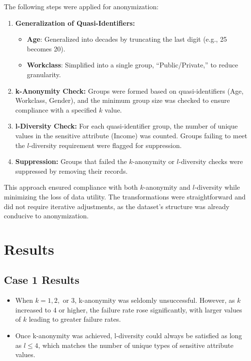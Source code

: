 \documentclass[conference]{IEEEtran}
\begin{document}
The following steps were applied for anonymization: \begin{enumerate} \item \textbf{Generalization of Quasi-Identifiers:} \begin{itemize} \item \textbf{Age}: Generalized into decades by truncating the last digit (e.g., 25 becomes 20). \item \textbf{Workclass}: Simplified into a single group, ``Public/Private,'' to reduce granularity. \end{itemize} \item \textbf{k-Anonymity Check:} Groups were formed based on quasi-identifiers (Age, Workclass, Gender), and the minimum group size was checked to ensure compliance with a specified $k$ value. \item \textbf{l-Diversity Check:} For each quasi-identifier group, the number of unique values in the sensitive attribute (Income) was counted. Groups failing to meet the $l$-diversity requirement were flagged for suppression. \item \textbf{Suppression:} Groups that failed the $k$-anonymity or $l$-diversity checks were suppressed by removing their records. \end{enumerate}

This approach ensured compliance with both $k$-anonymity and $l$-diversity while minimizing the loss of data utility. The transformations were straightforward and did not require iterative adjustments, as the dataset's structure was already conducive to anonymization.


\section{Results}

\subsection{Case 1 Results}
\begin{itemize}
	\item When $k=1, 2,$ or $3$, k-anonymity was seldomly unsuccessful. However, as $k$ increased to $4$ or higher, the failure rate rose significantly, with larger values of $k$ leading to greater failure rates.
	\item Once k-anonymity was achieved, l-diversity could always be satisfied as long as $l \leq 4$, which matches the number of unique types of sensitive attribute values.
\end{itemize}
\end{document}
